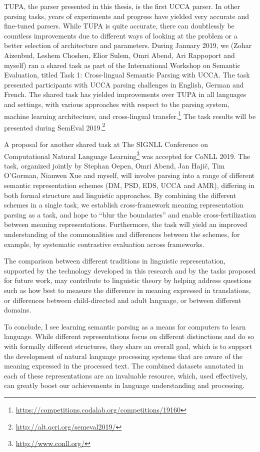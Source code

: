 \documentclass[12pt,a4paper,table]{report}
\begin{document}
TUPA, the parser presented in this thesis, is the first UCCA parser.
In other parsing tasks, years of experiments and progress have yielded very
accurate and fine-tuned parsers.
While TUPA is quite accurate, there can doubtlessly be countless improvements
due to different ways of looking at the problem or a better selection of architecture
and parameters.
During January 2019, we (Zohar Aizenbud, Leshem Choshen, Elior Sulem, Omri Abend,
Ari Rappoport and myself) ran a shared task as part of the
International Workshop on Semantic Evaluation, titled
Task 1: Cross-lingual Semantic Parsing with UCCA.
The task presented participants with UCCA parsing challenges
in English, German and French.
The shared task has yielded improvements over TUPA
in all languages and settings,
with various approaches with respect to the parsing system,
machine learning architecture, and cross-lingual
transfer.\footnote{\url{https://competitions.codalab.org/competitions/19160}}
The task results will be presented during SemEval
2019.\footnote{\url{http://alt.qcri.org/semeval2019/}}

A proposal for another shared task at
The SIGNLL Conference on Computational Natural Language
Learning\footnote{\url{http://www.conll.org/}} was accepted for CoNLL 2019.
The task, organized jointly by Stephan Oepen, Omri Abend, Jan Haji\v{c},
Tim O'Gorman, Nianwen Xue and myself,
will involve parsing into a range of different semantic representation schemes
(DM, PSD, EDS, UCCA and AMR), differing in both formal structure and linguistic
approaches.
By combining the different schemes in a single task, we
establish cross-framework meaning representation parsing as a task,
and hope to ``blur the boundaries'' and enable cross-fertilization between
meaning representations.
Furthermore, the task will yield an improved understanding of the commonalities
and differences between the schemes, for example, by systematic contrastive evaluation
across frameworks.

The comparison between different traditions in linguistic representation,
supported by the technology developed in this research
and by the tasks proposed for future work,
may contribute to linguistic theory by helping address questions such as
how best to measure the difference in meaning expressed in translations,
or differences between child-directed and adult language,
or between different domains.

To conclude, I see learning semantic parsing as a means for computers to learn language.
While different representations focus on different distinctions and do so
with formally different structures, they share an overall goal,
which is to support the development of natural language processing systems
that are aware of the meaning expressed in the processed text.
The combined datasets annotated in each of these representations are an invaluable
resource, which, used effectively, can greatly boost our achievements in
language understanding and processing.
\end{document}
